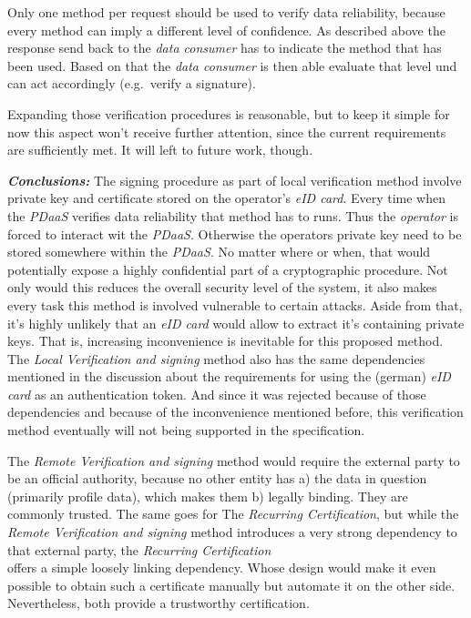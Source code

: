 \documentclass[12pt,english,a4paper,titlepage,cleardoublepage=empty,dottedtoc]{report}
\begin{document}
Only one method per request should be used to verify data reliability,
because every method can imply a different level of confidence. As
described above the response send back to the \emph{data consumer} has
to indicate the method that has been used. Based on that the \emph{data
consumer} is then able evaluate that level und can act accordingly
(e.g.~verify a signature).

Expanding those verification procedures is reasonable, but to keep it
simple for now this aspect won't receive further attention, since the
current requirements are sufficiently met. It will left to future work,
though.

\emph{\textbf{Conclusions:}} The signing procedure as part of local
verification method involve private key and certificate stored on the
operator's \emph{eID card}. Every time when the \emph{PDaaS} verifies
data reliability that method has to runs. Thus the \emph{operator} is
forced to interact wit the \emph{PDaaS}. Otherwise the operators private
key need to be stored somewhere within the \emph{PDaaS}. No matter where
or when, that would potentially expose a highly confidential part of a
cryptographic procedure. Not only would this reduces the overall
security level of the system, it also makes every task this method is
involved vulnerable to certain attacks. Aside from that, it's highly
unlikely that an \emph{eID card} would allow to extract it's containing
private keys. That is, increasing inconvenience is inevitable for this
proposed method. The \emph{Local Verification and signing} method also
has the same dependencies mentioned in the discussion about the
requirements for using the (german) \emph{eID card} as an authentication
token. And since it was rejected because of those dependencies and
because of the inconvenience mentioned before, this verification method
eventually will not being supported in the specification.

The \emph{Remote Verification and signing} method would require the
external party to be an official authority, because no other entity has
a) the data in question (primarily profile data), which makes them b)
legally binding. They are commonly trusted. The same goes for The
\emph{Recurring Certification}, but while the \emph{Remote Verification
and signing} method introduces a very strong dependency to that external
party, the \emph{Recurring Certification}\\
offers a simple loosely linking dependency. Whose design would make it
even possible to obtain such a certificate manually but automate it on
the other side. Nevertheless, both provide a trustworthy certification.
\end{document}
